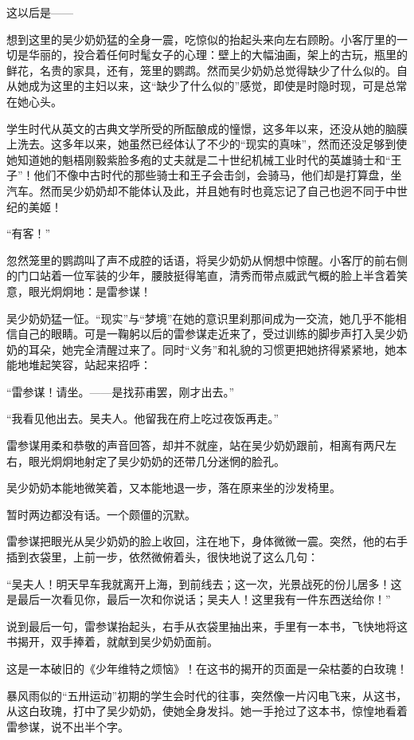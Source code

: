 \par 这以后是——
\par 想到这里的吴少奶奶猛的全身一震，吃惊似的抬起头来向左右顾盼。小客厅里的一切是华丽的，投合着任何时髦女子的心理：壁上的大幅油画，架上的古玩，瓶里的鲜花，名贵的家具，还有，笼里的鹦鹉。然而吴少奶奶总觉得缺少了什么似的。自从她成为这里的主妇以来，这“缺少了什么似的”感觉，即使是时隐时现，可是总常在她心头。
\par 学生时代从英文的古典文学所受的所酝酿成的憧憬，这多年以来，还没从她的脑膜上洗去。这多年以来，她虽然已经体认了不少的“现实的真味”，然而还没足够到使她知道她的魁梧刚毅紫脸多疱的丈夫就是二十世纪机械工业时代的英雄骑士和“王子”！他们不像中古时代的那些骑士和王子会击剑，会骑马，他们却是打算盘，坐汽车。然而吴少奶奶却不能体认及此，并且她有时也竟忘记了自己也迥不同于中世纪的美姬！
\par “有客！”
\par 忽然笼里的鹦鹉叫了声不成腔的话语，将吴少奶奶从惘想中惊醒。小客厅的前右侧的门口站着一位军装的少年，腰肢挺得笔直，清秀而带点威武气概的脸上半含着笑意，眼光炯炯地：是雷参谋！
\par 吴少奶奶猛一怔。“现实”与“梦境”在她的意识里刹那间成为一交流，她几乎不能相信自己的眼睛。可是一鞠躬以后的雷参谋走近来了，受过训练的脚步声打入吴少奶奶的耳朵，她完全清醒过来了。同时“义务”和礼貌的习惯更把她挤得紧紧地，她本能地堆起笑容，站起来招呼：
\par “雷参谋！请坐。——是找荪甫罢，刚才出去。”
\par “我看见他出去。吴夫人。他留我在府上吃过夜饭再走。”
\par 雷参谋用柔和恭敬的声音回答，却并不就座，站在吴少奶奶跟前，相离有两尺左右，眼光炯炯地射定了吴少奶奶的还带几分迷惘的脸孔。
\par 吴少奶奶本能地微笑着，又本能地退一步，落在原来坐的沙发椅里。
\par 暂时两边都没有话。一个颇僵的沉默。
\par 雷参谋把眼光从吴少奶奶的脸上收回，注在地下，身体微微一震。突然，他的右手插到衣袋里，上前一步，依然微俯着头，很快地说了这么几句：
\par “吴夫人！明天早车我就离开上海，到前线去；这一次，光景战死的份儿居多！这是最后一次看见你，最后一次和你说话；吴夫人！这里我有一件东西送给你！”
\par 说到最后一句，雷参谋抬起头，右手从衣袋里抽出来，手里有一本书，飞快地将这书揭开，双手捧着，就献到吴少奶奶面前。
\par 这是一本破旧的《少年维特之烦恼》！在这书的揭开的页面是一朵枯萎的白玫瑰！
\par 暴风雨似的“五卅运动”初期的学生会时代的往事，突然像一片闪电飞来，从这书，从这白玫瑰，打中了吴少奶奶，使她全身发抖。她一手抢过了这本书，惊惶地看着雷参谋，说不出半个字。
